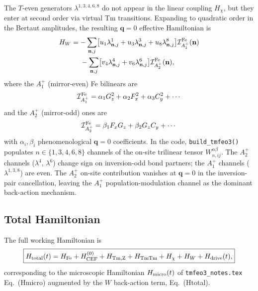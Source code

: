 \documentclass[11pt]{article}
\begin{document}
The $T$-even generators $\lambda^{1,3,4,6,8}$ do not appear in the
linear coupling $H_\chi$, but they enter at second order via virtual
Tm transitions.  Expanding to quadratic order in the Bertaut
amplitudes, the resulting $\mathbf{q}=0$ effective Hamiltonian is
\begin{equation}
\begin{aligned}
H_W = {}&
{-}\sum_{\mathbf{n},j}\bigl[
u_1\lambda^1_{\mathbf{n},j}
+ u_3\lambda^3_{\mathbf{n},j}
+ u_8\lambda^8_{\mathbf{n},j}\bigr]
\mathcal{I}^{\rm Fe}_{A_1^+}(\mathbf{n})\\
&-\sum_{\mathbf{n},j}\bigl[
v_4\lambda^4_{\mathbf{n},j}
+ v_6\lambda^6_{\mathbf{n},j}\bigr]
\mathcal{I}^{\rm Fe}_{A_2^+}(\mathbf{n}),
\end{aligned}
\label{eq:HW}
\end{equation}
where the $A_1^+$ (mirror-even) Fe bilinears are
\begin{equation}
\mathcal{I}^{\rm Fe}_{A_1^+}
= \alpha_1 G_z^2 + \alpha_2 F_x^2 + \alpha_3 C_y^2 + \cdots
\end{equation}
and the $A_2^+$ (mirror-odd) ones are
\begin{equation}
\mathcal{I}^{\rm Fe}_{A_2^+}
= \beta_1 F_xG_z + \beta_2 G_zC_y + \cdots
\end{equation}
with $\alpha_i, \beta_i$ phenomenological $\mathbf{q}=0$ coefficients.
In the code, \texttt{build\_tmfeo3()} populates
$n \in \{1,3,4,6,8\}$ channels of the on-site trilinear tensor
$W^{\alpha\beta}_{n,ij}$.
The $A_2^+$ channels ($\lambda^4$, $\lambda^6$) change sign on
inversion-odd bond partners; the $A_1^+$ channels ($\lambda^{1,3,8}$)
are even.  The $A_2^+$ on-site contribution vanishes at $\mathbf{q}=0$
in the inversion-pair cancellation, leaving the $A_1^+$
population-modulation channel as the dominant back-action mechanism.

\subsection{Total Hamiltonian}

The full working Hamiltonian is
\begin{equation}
\boxed{
H_{\rm total}(t) = H_{\rm Fe} + H_{\rm CEF}^{(0)}
+ H_{\rm Tm,Z} + H_{\rm TmTm}
+ H_\chi + H_W
+ H_{\rm drive}(t),
}
\label{eq:Htotal}
\end{equation}
corresponding to the microscopic Hamiltonian $H_{\rm micro}(t)$
of \texttt{tmfeo3\_notes.tex} Eq.~(Hmicro) augmented by the $W$ back-action
term, Eq.~(Htotal).
\end{document}
